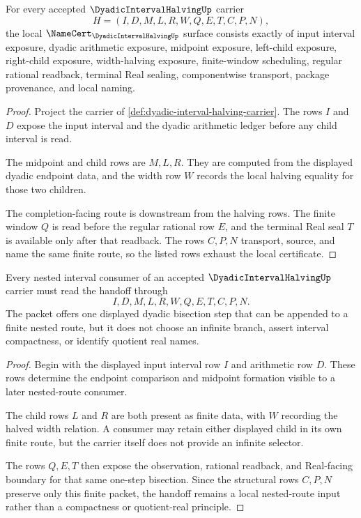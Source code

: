 \begin{theorem}
\label{thm:dyadic-interval-halving-namecert-obligations}
For every accepted $\DyadicIntervalHalvingUp$ carrier
$$
H=(I,D,M,L,R,W,Q,E,T,C,P,N),
$$
the local $\NameCert_{\DyadicIntervalHalvingUp}$ surface consists exactly of input interval exposure, dyadic arithmetic exposure, midpoint exposure, left-child exposure, right-child exposure, width-halving exposure, finite-window scheduling, regular rational readback, terminal Real sealing, componentwise transport, package provenance, and local naming.
\end{theorem}
\begin{proof}
Project the carrier of \autoref{def:dyadic-interval-halving-carrier}. The rows $I$ and $D$ expose the input interval and the dyadic arithmetic ledger before any child interval is read.

The midpoint and child rows are $M,L,R$. They are computed from the displayed dyadic endpoint data, and the width row $W$ records the local halving equality for those two children.

The completion-facing route is downstream from the halving rows. The finite window $Q$ is read before the regular rational row $E$, and the terminal Real seal $T$ is available only after that readback. The rows $C,P,N$ transport, source, and name the same finite route, so the listed rows exhaust the local certificate.
\end{proof}

\begin{theorem}
\label{thm:dyadic-interval-halving-nested-route}
Every nested interval consumer of an accepted $\DyadicIntervalHalvingUp$ carrier must read the handoff through
$$
I,D,M,L,R,W,Q,E,T,C,P,N .
$$
The packet offers one displayed dyadic bisection step that can be appended to a finite nested route, but it does not choose an infinite branch, assert interval compactness, or identify quotient real names.
\end{theorem}
\begin{proof}
Begin with the displayed input interval row $I$ and arithmetic row $D$. These rows determine the endpoint comparison and midpoint formation visible to a later nested-route consumer.

The child rows $L$ and $R$ are both present as finite data, with $W$ recording the halved width relation. A consumer may retain either displayed child in its own finite route, but the carrier itself does not provide an infinite selector.

The rows $Q,E,T$ then expose the observation, rational readback, and Real-facing boundary for that same one-step bisection. Since the structural rows $C,P,N$ preserve only this finite packet, the handoff remains a local nested-route input rather than a compactness or quotient-real principle.
\end{proof}

